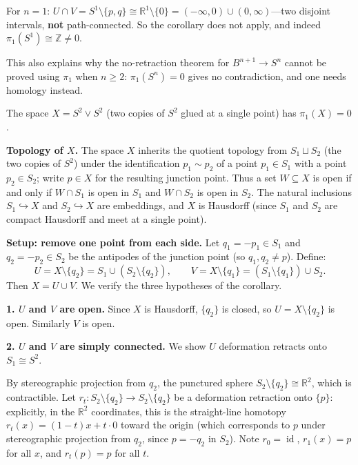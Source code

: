 \documentclass[11pt]{report}
\begin{document}
\begin{rembox}
For $n = 1$: $U \cap V = S^1 \setminus \{p, q\} \cong \mathbb{R}^1 \setminus \{0\} = (-\infty, 0) \cup (0, \infty)$---two disjoint intervals, \textbf{not} path-connected. So the corollary does not apply, and indeed $\pi_1(S^1) \cong \mathbb{Z} \neq 0$.

This also explains why the no-retraction theorem for $B^{n+1} \to S^n$ cannot be proved using $\pi_1$ when $n \geq 2$: $\pi_1(S^n) = 0$ gives no contradiction, and one needs homology instead.
\end{rembox}

\begin{exbox}
The space $X = S^2 \vee S^2$ (two copies of $S^2$ glued at a single point) has $\pi_1(X) = 0$.

\textbf{Topology of $X$.} The space $X$ inherits the quotient topology from $S_1 \sqcup S_2$ (the two copies of $S^2$) under the identification $p_1 \sim p_2$ of a point $p_1 \in S_1$ with a point $p_2 \in S_2$; write $p \in X$ for the resulting junction point. Thus a set $W \subseteq X$ is open if and only if $W \cap S_1$ is open in $S_1$ and $W \cap S_2$ is open in $S_2$. The natural inclusions $S_1 \hookrightarrow X$ and $S_2 \hookrightarrow X$ are embeddings, and $X$ is Hausdorff (since $S_1$ and $S_2$ are compact Hausdorff and meet at a single point).

\textbf{Setup: remove one point from each side.} Let $q_1 = -p_1 \in S_1$ and $q_2 = -p_2 \in S_2$ be the antipodes of the junction point (so $q_1, q_2 \neq p$). Define:
\[U = X \setminus \{q_2\} = S_1 \cup (S_2 \setminus \{q_2\}), \qquad V = X \setminus \{q_1\} = (S_1 \setminus \{q_1\}) \cup S_2.\]
Then $X = U \cup V$. We verify the three hypotheses of the corollary.

\textbf{1. $U$ and $V$ are open.} Since $X$ is Hausdorff, $\{q_2\}$ is closed, so $U = X \setminus \{q_2\}$ is open. Similarly $V$ is open.

\textbf{2. $U$ and $V$ are simply connected.} We show $U$ deformation retracts onto $S_1 \cong S^2$.

By stereographic projection from $q_2$, the punctured sphere $S_2 \setminus \{q_2\} \cong \mathbb{R}^2$, which is contractible. Let $r_t: S_2 \setminus \{q_2\} \to S_2 \setminus \{q_2\}$ be a deformation retraction onto $\{p\}$: explicitly, in the $\mathbb{R}^2$ coordinates, this is the straight-line homotopy $r_t(x) = (1-t)x + t \cdot 0$ toward the origin (which corresponds to $p$ under stereographic projection from $q_2$, since $p = -q_2$ in $S_2$). Note $r_0 = \operatorname{id}$, $r_1(x) = p$ for all $x$, and $r_t(p) = p$ for all $t$.


\end{exbox}
\end{document}
